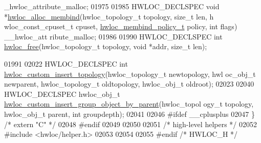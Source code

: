 \begin{DoxyCode}
      \_hwloc\_attribute\_malloc;
01975 
01985 HWLOC\_DECLSPEC \textcolor{keywordtype}{void} *\hyperlink{a00050_ga221a7edc5d436300374fa16463f607e5}{hwloc_alloc_membind}(hwloc\_topology\_t topology, \textcolor{keywordtype}{size\_t} len, h
      wloc\_const\_cpuset\_t cpuset, \hyperlink{a00050_gac9764f79505775d06407b40f5e4661e8}{hwloc_membind_policy_t} policy, \textcolor{keywordtype}{int} flags) \_\_hwloc\_att
      ribute\_malloc;
01986 
01990 HWLOC\_DECLSPEC \textcolor{keywordtype}{int} \hyperlink{a00050_ga986d9b4cc76da592c4b937c6cb7d9d56}{hwloc_free}(hwloc\_topology\_t topology, \textcolor{keywordtype}{void} *addr, \textcolor{keywordtype}{size\_t} len);
      
01991 
02022 HWLOC\_DECLSPEC \textcolor{keywordtype}{int} \hyperlink{a00051_ga59ccf6a63cb23d63940e8b782059d9cb}{hwloc_custom_insert_topology}(hwloc\_topology\_t newtopology, hwl
      oc\_obj\_t newparent, hwloc\_topology\_t oldtopology, hwloc\_obj\_t oldroot);
02023 
02040 HWLOC\_DECLSPEC hwloc\_obj\_t \hyperlink{a00051_gac1037fe389bfa7c2bf0e3739b7e20844}{hwloc_custom_insert_group_object_by_parent}(hwloc\_topol
      ogy\_t topology, hwloc\_obj\_t parent, \textcolor{keywordtype}{int} groupdepth);
02041 
02046 \textcolor{preprocessor}{#ifdef \_\_cplusplus}
02047 \textcolor{preprocessor}{}\} \textcolor{comment}{/* extern "C" */}
02048 \textcolor{preprocessor}{#endif}
02049 \textcolor{preprocessor}{}
02050 
02051 \textcolor{comment}{/* high-level helpers */}
02052 \textcolor{preprocessor}{#include <hwloc/helper.h>}
02053 
02054 
02055 \textcolor{preprocessor}{#endif }\textcolor{comment}{/* HWLOC\_H */}
\end{DoxyCode}
